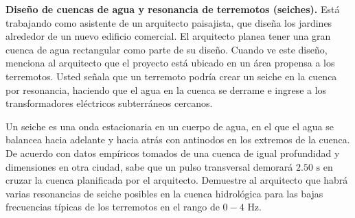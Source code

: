 \item \textbf{Diseño de cuencas de agua y resonancia de terremotos (seiches).}
Está trabajando como asistente de un arquitecto paisajista, que diseña los jardines alrededor de un nuevo edificio comercial. El arquitecto planea tener una gran cuenca de agua rectangular como parte de su diseño. Cuando ve este diseño, menciona al arquitecto que el proyecto está ubicado en un área propensa a los terremotos. Usted señala que un terremoto podría crear un seiche en la cuenca por resonancia, haciendo que el agua en la cuenca se derrame e ingrese a los transformadores eléctricos subterráneos cercanos.

Un seiche es una onda estacionaria en un cuerpo de agua, en el que el agua se balancea hacia adelante y hacia atrás con antinodos en los extremos de la cuenca. De acuerdo con datos empíricos tomados de una cuenca de igual profundidad y dimensiones en otra ciudad, sabe que un pulso transversal demorará $2.50\text{ s}$ en cruzar la cuenca planificada por el arquitecto. Demuestre al arquitecto que habrá varias resonancias de seiche posibles en la cuenca hidrológica para las bajas frecuencias típicas de los terremotos en el rango de $0 - 4\text{ Hz}$.